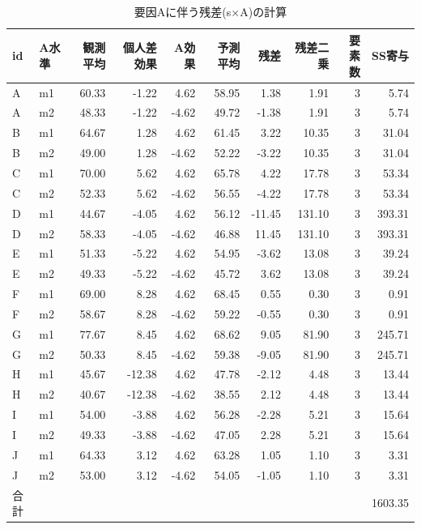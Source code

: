\documentclass{ltjbook}
\begin{document}
\begin{table}[ht]
\centering
	\caption{要因Aに伴う残差(s×A)の計算}
	\label{tbl:21_10}
\small
\begin{tabular}{llrrrrrrrr}
  \hline
id & A水準 & 観測平均 & 個人差効果 & A効果 & 予測平均 & 残差 & 残差二乗 & 要素数 & SS寄与 \\
  \hline
A & m1 & 60.33 & -1.22 & 4.62 & 58.95 & 1.38 & 1.91 & 3 & 5.74 \\
  A & m2 & 48.33 & -1.22 & -4.62 & 49.72 & -1.38 & 1.91 & 3 & 5.74 \\
  B & m1 & 64.67 & 1.28 & 4.62 & 61.45 & 3.22 & 10.35 & 3 & 31.04 \\
  B & m2 & 49.00 & 1.28 & -4.62 & 52.22 & -3.22 & 10.35 & 3 & 31.04 \\
  C & m1 & 70.00 & 5.62 & 4.62 & 65.78 & 4.22 & 17.78 & 3 & 53.34 \\
  C & m2 & 52.33 & 5.62 & -4.62 & 56.55 & -4.22 & 17.78 & 3 & 53.34 \\
  D & m1 & 44.67 & -4.05 & 4.62 & 56.12 & -11.45 & 131.10 & 3 & 393.31 \\
  D & m2 & 58.33 & -4.05 & -4.62 & 46.88 & 11.45 & 131.10 & 3 & 393.31 \\
  E & m1 & 51.33 & -5.22 & 4.62 & 54.95 & -3.62 & 13.08 & 3 & 39.24 \\
  E & m2 & 49.33 & -5.22 & -4.62 & 45.72 & 3.62 & 13.08 & 3 & 39.24 \\
  F & m1 & 69.00 & 8.28 & 4.62 & 68.45 & 0.55 & 0.30 & 3 & 0.91 \\
  F & m2 & 58.67 & 8.28 & -4.62 & 59.22 & -0.55 & 0.30 & 3 & 0.91 \\
  G & m1 & 77.67 & 8.45 & 4.62 & 68.62 & 9.05 & 81.90 & 3 & 245.71 \\
  G & m2 & 50.33 & 8.45 & -4.62 & 59.38 & -9.05 & 81.90 & 3 & 245.71 \\
  H & m1 & 45.67 & -12.38 & 4.62 & 47.78 & -2.12 & 4.48 & 3 & 13.44 \\
  H & m2 & 40.67 & -12.38 & -4.62 & 38.55 & 2.12 & 4.48 & 3 & 13.44 \\
  I & m1 & 54.00 & -3.88 & 4.62 & 56.28 & -2.28 & 5.21 & 3 & 15.64 \\
  I & m2 & 49.33 & -3.88 & -4.62 & 47.05 & 2.28 & 5.21 & 3 & 15.64 \\
  J & m1 & 64.33 & 3.12 & 4.62 & 63.28 & 1.05 & 1.10 & 3 & 3.31 \\
  J & m2 & 53.00 & 3.12 & -4.62 & 54.05 & -1.05 & 1.10 & 3 & 3.31 \\
  \hline
  合計 &  &  &  &  &  &  &  &  & 1603.35 \\
   \hline
\end{tabular}
\end{table}
\end{document}
